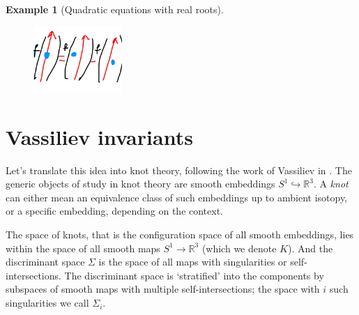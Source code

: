 \documentclass[12pt]{report}
\newcommand{\R}{\mathbb{R}}
\theoremstyle{regular}
\numberwithin{clause}{chapter}
\newtheorem{example}[clause]{Example}
\begin{document}
\begin{example}[Quadratic equations with real roots]
        \begin{figure}[H]
                \centering
                \includegraphics[width=0.3\textwidth]{graphics/simple_singularity_relation.jpg}
        \end{figure}
        \end{example}



        \section*{Vassiliev invariants}

        Let's translate this idea into knot theory, following the work of Vassiliev in \cite{cohomology-of-knot-spaces, complements-of-discriminants-of-smooth-maps-topology-and-applications}. The generic objects of study in knot theory are smooth embeddings \(S^{1} \hookrightarrow \R^{3}\). A \textit{knot} can either mean an equivalence class of such embeddings up to ambient isotopy, or a specific embedding, depending on the context.

        The space of knots, that is the configuration space of all smooth embeddings, lies within the space of all smooth maps \(S^{1} \to \R^{3}\) (which we denote \(K\)). And the discriminant space \(\Sigma\) is the space of all maps with singularities or self-intersections. The discriminant space is `stratified' into the components by subspaces of smooth maps with multiple self-intersections; the space with \(i\) such singularities we call \(\Sigma_{i}\).
\end{document}
